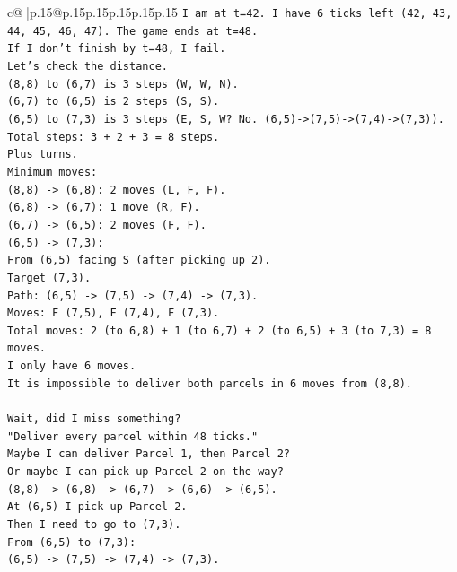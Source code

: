 \documentclass{article}
\begin{document}
{\begin{supertabular}{c@{$\;$}|p{.15\linewidth}@{}p{.15\linewidth}p{.15\linewidth}p{.15\linewidth}p{.15\linewidth}p{.15\linewidth}}
{{{\texttt{I am at t=42. I have 6 ticks left (42, 43, 44, 45, 46, 47). The game ends at t=48.} \\
\texttt{If I don't finish by t=48, I fail.} \\
\texttt{Let's check the distance.} \\
\texttt{(8,8) to (6,7) is 3 steps (W, W, N).} \\
\texttt{(6,7) to (6,5) is 2 steps (S, S).} \\
\texttt{(6,5) to (7,3) is 3 steps (E, S, W? No. (6,5){-}>(7,5){-}>(7,4){-}>(7,3)).} \\
\texttt{Total steps: 3 + 2 + 3 = 8 steps.} \\
\texttt{Plus turns.} \\
\texttt{Minimum moves:} \\
\texttt{(8,8) {-}> (6,8): 2 moves (L, F, F).} \\
\texttt{(6,8) {-}> (6,7): 1 move (R, F).} \\
\texttt{(6,7) {-}> (6,5): 2 moves (F, F).} \\
\texttt{(6,5) {-}> (7,3):} \\
\texttt{From (6,5) facing S (after picking up 2).} \\
\texttt{Target (7,3).} \\
\texttt{Path: (6,5) {-}> (7,5) {-}> (7,4) {-}> (7,3).} \\
\texttt{Moves: F (7,5), F (7,4), F (7,3).} \\
\texttt{Total moves: 2 (to 6,8) + 1 (to 6,7) + 2 (to 6,5) + 3 (to 7,3) = 8 moves.} \\
\texttt{I only have 6 moves.} \\
\texttt{It is impossible to deliver both parcels in 6 moves from (8,8).} \\
\\ 
\texttt{Wait, did I miss something?} \\
\texttt{"Deliver every parcel within 48 ticks."} \\
\texttt{Maybe I can deliver Parcel 1, then Parcel 2?} \\
\texttt{Or maybe I can pick up Parcel 2 on the way?} \\
\texttt{(8,8) {-}> (6,8) {-}> (6,7) {-}> (6,6) {-}> (6,5).} \\
\texttt{At (6,5) I pick up Parcel 2.} \\
\texttt{Then I need to go to (7,3).} \\
\texttt{From (6,5) to (7,3):} \\
\texttt{(6,5) {-}> (7,5) {-}> (7,4) {-}> (7,3).} \\
}}}
\end{supertabular}}
\end{document}
